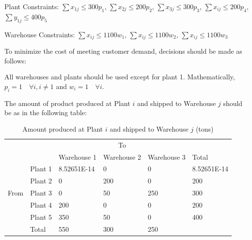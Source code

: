 \documentclass{article}
\begin{document}
Plant Constraints: $\sum{x_{1j}} \leq 300p_1$, $\sum{x_{2j}} \leq 200p_2$, $\sum{x_{3j}} \leq 300p_3$, $\sum{x_{ij}} \leq 200p_4$, $\sum{y_{1j}} \leq 400p_5$

Warehouse Constraints: $\sum{x_{ij}} \leq 1100w_1$, $\sum{x_{ij}} \leq 1100w_2$, $\sum{x_{ij}} \leq 1100w_3$

To minimize the cost of meeting customer demand, decisions should be made as follows:

All warehouses and plants should be used except for plant 1. Mathematically, $p_i = 1 \quad \forall i, i \neq 1$ and $w_i = 1 \quad \forall i$.

The amount of product produced at Plant $i$ and shipped to Warehouse $j$ should be as in the following table:
\begin{table}[!ht]
    \caption{Amount produced at Plant $i$ and shipped to Warehouse $j$ (tons)}
    \centering
    \begin{tabular}{llllll}
        \cline {3-5}
        ~ & \multicolumn{1}{l|}{} & ~ & \multicolumn{1}{c}{To} & \multicolumn{1}{l|}{} & ~ \\ \cline{2-6}
        ~ & \multicolumn{1}{|l|}{} & \multicolumn{1}{l|}{Warehouse 1} & \multicolumn{1}{l|}{Warehouse 2} & \multicolumn{1}{l|}{Warehouse 3} & \multicolumn{1}{l|}{Total} \\ \hline
        \multicolumn{1}{|l|}{} & \multicolumn{1}{l|}{Plant 1} & \multicolumn{1}{l|}{8.52651E-14} & \multicolumn{1}{l|}{0} & \multicolumn{1}{l|}{0} & \multicolumn{1}{l|}{8.52651E-14} \\ \cline{2-6}
        \multicolumn{1}{|l|}{} & \multicolumn{1}{l|}{Plant 2} & \multicolumn{1}{l|}{0} & \multicolumn{1}{l|}{200} & \multicolumn{1}{l|}{0} & \multicolumn{1}{l|}{200} \\ \cline{2-6}
        \multicolumn{1}{|l|}{From} & \multicolumn{1}{l|}{Plant 3} & \multicolumn{1}{l|}{0} & \multicolumn{1}{l|}{50} & \multicolumn{1}{l|}{250} & \multicolumn{1}{l|}{300} \\ \cline{2-6}
        \multicolumn{1}{|l|}{} & \multicolumn{1}{l|}{Plant 4} & \multicolumn{1}{l|}{200} & \multicolumn{1}{l|}{0} & \multicolumn{1}{l|}{0} & \multicolumn{1}{l|}{200} \\ \cline{2-6}
        \multicolumn{1}{|l|}{} & \multicolumn{1}{l|}{Plant 5} & \multicolumn{1}{l|}{350} & \multicolumn{1}{l|}{50} & \multicolumn{1}{l|}{0} & \multicolumn{1}{l|}{400} \\ \hline
        \multicolumn{1}{l|}{} & \multicolumn{1}{l|}{Total} & \multicolumn{1}{l|}{550} & \multicolumn{1}{l|}{300} & \multicolumn{1}{l|}{250} & ~ \\ \cline{2-5}
    \end{tabular}
\end{table}
\end{document}
